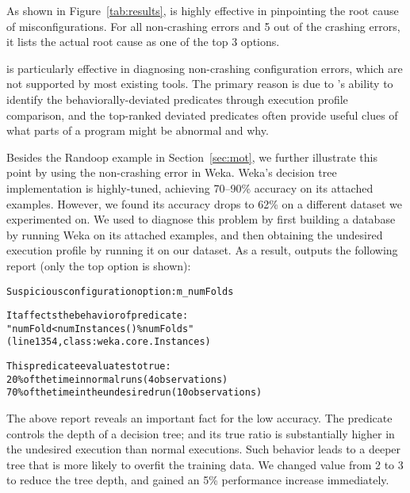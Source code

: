 

As shown in Figure~\ref{tab:results},
\ourtool is highly effective in pinpointing the root cause of
misconfigurations. For all \noncrash non-crashing errors
and 5 out of the \crash crashing errors, it lists the actual root cause as one of the top 3 options. 


\ourtool is particularly effective in diagnosing non-crashing configuration errors,
which are not supported by most existing tools. The primary reason is due to
\ourtool's ability to identify the behaviorally-deviated predicates through
execution profile comparison, and the top-ranked deviated predicates often provide
useful clues of what parts of a program might be abnormal and why.

Besides the Randoop example in Section~\ref{sec:mot}, we further illustrate
this point by using the non-crashing error in Weka.
Weka's decision tree implementation is highly-tuned, achieving 70--90\% accuracy on
its attached examples. However, we found its accuracy drops to 62\%
on a different dataset we experimented on. We used \ourtool to diagnose this
problem by first building a database by running Weka on its attached examples, and
then
obtaining the undesired execution profile by running it on our dataset. As a result,
\ourtool outputs the following report (only the top option is shown):


\begin{CodeOut}
\begin{alltt} 
Suspicious configuration option: m\_numFolds

It affects the behavior of predicate:
"numFold < numInstances() \% numFolds"
(line 1354, class: weka.core.Instances) 

This predicate evaluates to true:
  20\% of the time in normal runs (4 observations)
  70\% of the time in the undesired run (10 observations)

\end{alltt}
\end{CodeOut}

\vspace{-3mm}

The above report reveals an important fact for the low accuracy.
The predicate  controls
the depth of a decision tree; and its
true ratio is substantially higher in the undesired execution
than normal executions. Such behavior leads
to a deeper tree that is more likely to overfit the training
data. We changed 
value from 2 to 3 to reduce the tree depth, and
gained an 5\% performance increase immediately.

